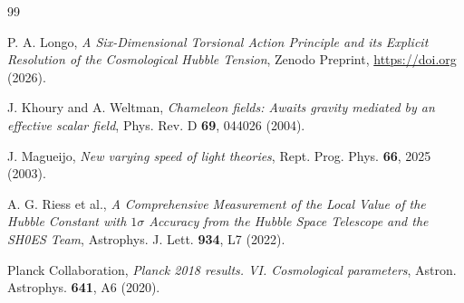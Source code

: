 \documentclass[11pt,a4paper]{article}
\begin{document}
	\begin{thebibliography}{99}
		
		P. A. Longo, 
		\textit{A Six-Dimensional Torsional Action Principle and its Explicit Resolution of the Cosmological Hubble Tension}, 
		Zenodo Preprint, \url{https://doi.org} (2026). 
		
		J. Khoury and A. Weltman,
		\textit{Chameleon fields: Awaits gravity mediated by an effective scalar field},
		Phys. Rev. D \textbf{69}, 044026 (2004).
		
		J. Magueijo,
		\textit{New varying speed of light theories},
		Rept. Prog. Phys. \textbf{66}, 2025 (2003).
		
		A. G. Riess et al.,
		\textit{A Comprehensive Measurement of the Local Value of the Hubble Constant with $1\sigma$ Accuracy from the Hubble Space Telescope and the SH0ES Team},
		Astrophys. J. Lett. \textbf{934}, L7 (2022).
		
		Planck Collaboration,
		\textit{Planck 2018 results. VI. Cosmological parameters},
		Astron. Astrophys. \textbf{641}, A6 (2020).
		
	\end{thebibliography}
\end{document}
